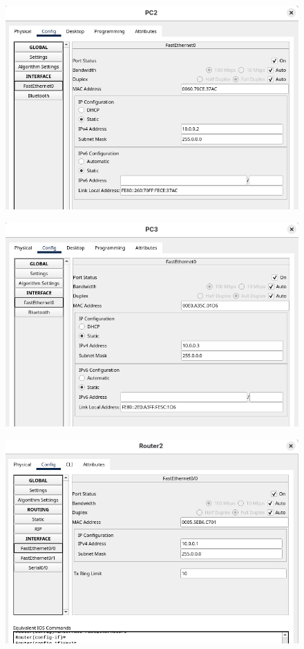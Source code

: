 \begin{figure}[h]
    \centering
    \includegraphics[width=1\textwidth]{img/15.png}
\end{figure}
\begin{figure}[h]
    \centering
    \includegraphics[width=1\textwidth]{img/16.png}
\end{figure}
\begin{figure}[h]
    \centering
    \includegraphics[width=1\textwidth]{img/17.png}
\end{figure}

